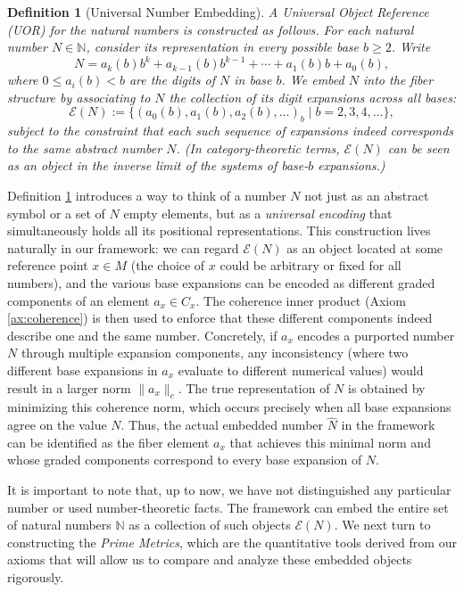 \documentclass[11pt]{article}
\newtheorem{definition}{Definition}[section]
\begin{document}
\begin{definition}[Universal Number Embedding]\label{def:UOR}
A \emph{Universal Object Reference (UOR)} for the natural numbers is constructed as follows. For each natural number $N \in \mathbb{N}$, consider its representation in every possible base $b \ge 2$. Write 
\[N = a_k(b) b^k + a_{k-1}(b) b^{k-1} + \cdots + a_1(b) b + a_0(b),\] 
where $0 \le a_i(b) < b$ are the digits of $N$ in base $b$. We embed $N$ into the fiber structure by associating to $N$ the collection of its digit expansions across all bases:
\[
\mathcal{E}(N) := \Big\{ (a_0(b), a_1(b), a_2(b),\dots)_b \;\Big|\; b = 2,3,4,\dots \Big\},
\] 
subject to the constraint that each such sequence of expansions indeed corresponds to the same abstract number $N$. (In category-theoretic terms, $\mathcal{E}(N)$ can be seen as an object in the inverse limit of the systems of base-$b$ expansions.)
\end{definition}

Definition \ref{def:UOR} introduces a way to think of a number $N$ not just as an abstract symbol or a set of $N$ empty elements, but as a \emph{universal encoding} that simultaneously holds all its positional representations. This construction lives naturally in our framework: we can regard $\mathcal{E}(N)$ as an object located at some reference point $x \in M$ (the choice of $x$ could be arbitrary or fixed for all numbers), and the various base expansions can be encoded as different graded components of an element $a_x \in C_x$. The coherence inner product (Axiom \ref{ax:coherence}) is then used to enforce that these different components indeed describe one and the same number. Concretely, if $a_x$ encodes a purported number $N$ through multiple expansion components, any inconsistency (where two different base expansions in $a_x$ evaluate to different numerical values) would result in a larger norm $\|a_x\|_c$. The true representation of $N$ is obtained by minimizing this coherence norm, which occurs precisely when all base expansions agree on the value $N$. Thus, the actual embedded number $\hat{N}$ in the framework can be identified as the fiber element $a_x$ that achieves this minimal norm and whose graded components correspond to every base expansion of $N$.

It is important to note that, up to now, we have not distinguished any particular number or used number-theoretic facts. The framework can embed the entire set of natural numbers $\mathbb{N}$ as a collection of such objects $\mathcal{E}(N)$. We next turn to constructing the \emph{Prime Metrics}, which are the quantitative tools derived from our axioms that will allow us to compare and analyze these embedded objects rigorously.
\end{document}
